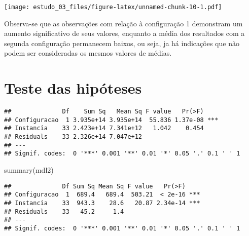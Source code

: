 \documentclass[
]{article}
\newenvironment{Shaded}{\begin{snugshade}}{\end{snugshade}}
\newcommand{\AttributeTok}[1]{\textcolor[rgb]{0.77,0.63,0.00}{#1}}
\newcommand{\CommentTok}[1]{\textcolor[rgb]{0.56,0.35,0.01}{\textit{#1}}}
\newcommand{\DecValTok}[1]{\textcolor[rgb]{0.00,0.00,0.81}{#1}}
\newcommand{\FloatTok}[1]{\textcolor[rgb]{0.00,0.00,0.81}{#1}}
\newcommand{\FunctionTok}[1]{\textcolor[rgb]{0.00,0.00,0.00}{#1}}
\newcommand{\NormalTok}[1]{#1}
\newcommand{\OtherTok}[1]{\textcolor[rgb]{0.56,0.35,0.01}{#1}}
\newcommand{\SpecialCharTok}[1]{\textcolor[rgb]{0.00,0.00,0.00}{#1}}
\begin{document}
\texttt{[image: estudo\_03\_files/figure-latex/unnamed-chunk-10-1.pdf]}

Observa-se que as observações com relação à configuração 1 demonstram um
aumento significativo de seus valores, enquanto a média dos resultados
com a segunda configuração permanecem baixos, ou seja, ja há indicações
que não podem ser consideradas os mesmos valores de médias.

\hypertarget{teste-das-hipuxf3teses}{%
\section{Teste das hipóteses}\label{teste-das-hipuxf3teses}}

\begin{Shaded}
\end{Shaded}

\begin{verbatim}
##              Df    Sum Sq   Mean Sq F value   Pr(>F)    
## Configuracao  1 3.935e+14 3.935e+14  55.836 1.37e-08 ***
## Instancia    33 2.423e+14 7.341e+12   1.042    0.454    
## Residuals    33 2.326e+14 7.047e+12                     
## ---
## Signif. codes:  0 '***' 0.001 '**' 0.01 '*' 0.05 '.' 0.1 ' ' 1
\end{verbatim}

\begin{Shaded}
\begin{Highlighting}[]
\FunctionTok{summary}\NormalTok{(mdl2)}
\end{Highlighting}
\end{Shaded}

\begin{verbatim}
##              Df Sum Sq Mean Sq F value   Pr(>F)    
## Configuracao  1  689.4   689.4  503.21  < 2e-16 ***
## Instancia    33  943.3    28.6   20.87 2.34e-14 ***
## Residuals    33   45.2     1.4                     
## ---
## Signif. codes:  0 '***' 0.001 '**' 0.01 '*' 0.05 '.' 0.1 ' ' 1
\end{verbatim}
\end{document}
